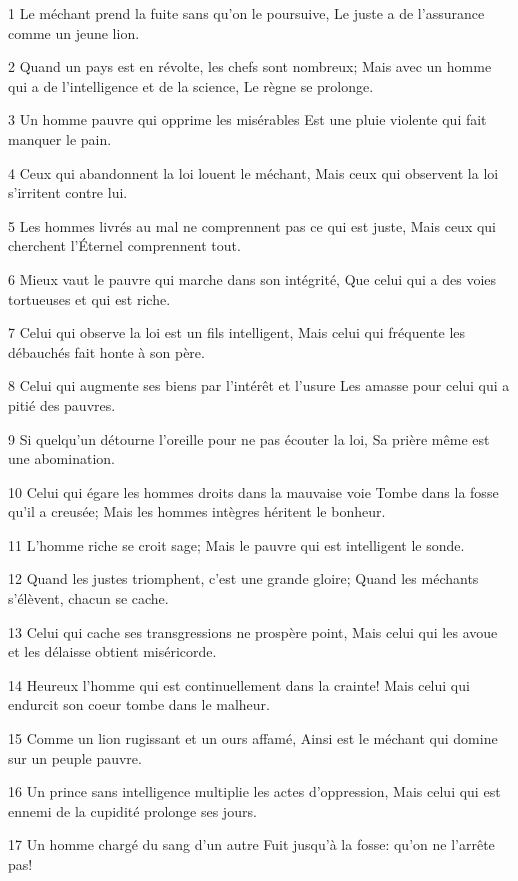 \par 1 Le méchant prend la fuite sans qu'on le poursuive, Le juste a de l'assurance comme un jeune lion.
\par 2 Quand un pays est en révolte, les chefs sont nombreux; Mais avec un homme qui a de l'intelligence et de la science, Le règne se prolonge.
\par 3 Un homme pauvre qui opprime les misérables Est une pluie violente qui fait manquer le pain.
\par 4 Ceux qui abandonnent la loi louent le méchant, Mais ceux qui observent la loi s'irritent contre lui.
\par 5 Les hommes livrés au mal ne comprennent pas ce qui est juste, Mais ceux qui cherchent l'Éternel comprennent tout.
\par 6 Mieux vaut le pauvre qui marche dans son intégrité, Que celui qui a des voies tortueuses et qui est riche.
\par 7 Celui qui observe la loi est un fils intelligent, Mais celui qui fréquente les débauchés fait honte à son père.
\par 8 Celui qui augmente ses biens par l'intérêt et l'usure Les amasse pour celui qui a pitié des pauvres.
\par 9 Si quelqu'un détourne l'oreille pour ne pas écouter la loi, Sa prière même est une abomination.
\par 10 Celui qui égare les hommes droits dans la mauvaise voie Tombe dans la fosse qu'il a creusée; Mais les hommes intègres héritent le bonheur.
\par 11 L'homme riche se croit sage; Mais le pauvre qui est intelligent le sonde.
\par 12 Quand les justes triomphent, c'est une grande gloire; Quand les méchants s'élèvent, chacun se cache.
\par 13 Celui qui cache ses transgressions ne prospère point, Mais celui qui les avoue et les délaisse obtient miséricorde.
\par 14 Heureux l'homme qui est continuellement dans la crainte! Mais celui qui endurcit son coeur tombe dans le malheur.
\par 15 Comme un lion rugissant et un ours affamé, Ainsi est le méchant qui domine sur un peuple pauvre.
\par 16 Un prince sans intelligence multiplie les actes d'oppression, Mais celui qui est ennemi de la cupidité prolonge ses jours.
\par 17 Un homme chargé du sang d'un autre Fuit jusqu'à la fosse: qu'on ne l'arrête pas!
